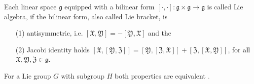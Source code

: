 \documentclass[envcountsect,runningheads]{llncs}
\begin{document}
\begin{definition}
Each linear space $\mathfrak{g}$ equipped with a bilinear form $[\cdot,\cdot]: \mathfrak{g} \times \mathfrak{g} \rightarrow \mathfrak{g}$ is called Lie algebra, if the bilinear form, also called Lie bracket, is 
\begin{itemize}
	\item[(1)] antisymmetric, i.e. $[\mathfrak{X}, \mathfrak{Y}] = -[\mathfrak{Y}, \mathfrak{X}]$ and the
	\item[(2)] Jacobi identity holds $[\mathfrak{X},[\mathfrak{Y},\mathfrak{Z}]] = [\mathfrak{Y},[\mathfrak{Z},\mathfrak{X}]] + [\mathfrak{Z},[\mathfrak{X},\mathfrak{Y}]]$, for all $\mathfrak{X}, \mathfrak{Y}, \mathfrak{Z} \in \mathfrak{g}$.
\end{itemize}
\end{definition}

\begin{remarkdef}
For a Lie group $G$ with subgroup $H$ both properties are equivalent \cite[pp.~25-27]{van2003lie}.
\end{remarkdef}
\end{document}
